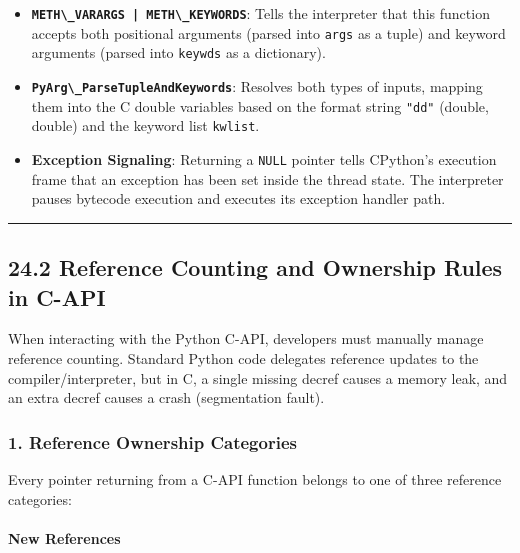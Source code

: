 \begin{itemize}
\tightlist
\item
  \textbf{\passthrough{\lstinline!METH\_VARARGS | METH\_KEYWORDS!}}:
  Tells the interpreter that this function accepts both positional
  arguments (parsed into \passthrough{\lstinline!args!} as a tuple) and
  keyword arguments (parsed into \passthrough{\lstinline!keywds!} as a
  dictionary).
\item
  \textbf{\passthrough{\lstinline!PyArg\_ParseTupleAndKeywords!}}:
  Resolves both types of inputs, mapping them into the C double
  variables based on the format string \passthrough{\lstinline!"dd"!}
  (double, double) and the keyword list
  \passthrough{\lstinline!kwlist!}.
\item
  \textbf{Exception Signaling}: Returning a
  \passthrough{\lstinline!NULL!} pointer tells CPython's execution frame
  that an exception has been set inside the thread state. The
  interpreter pauses bytecode execution and executes its exception
  handler path.
\end{itemize}

\begin{center}\rule{0.5\linewidth}{0.5pt}\end{center}

\hypertarget{reference-counting-and-ownership-rules-in-c-api}{%
\subsection{24.2 Reference Counting and Ownership Rules in
C-API}\label{reference-counting-and-ownership-rules-in-c-api}}

When interacting with the Python C-API, developers must manually manage
reference counting. Standard Python code delegates reference updates to
the compiler/interpreter, but in C, a single missing decref causes a
memory leak, and an extra decref causes a crash (segmentation fault).

\hypertarget{reference-ownership-categories}{%
\subsubsection{1. Reference Ownership
Categories}\label{reference-ownership-categories}}

Every pointer returning from a C-API function belongs to one of three
reference categories:

\hypertarget{new-references}{%
\paragraph{New References}\label{new-references}}

